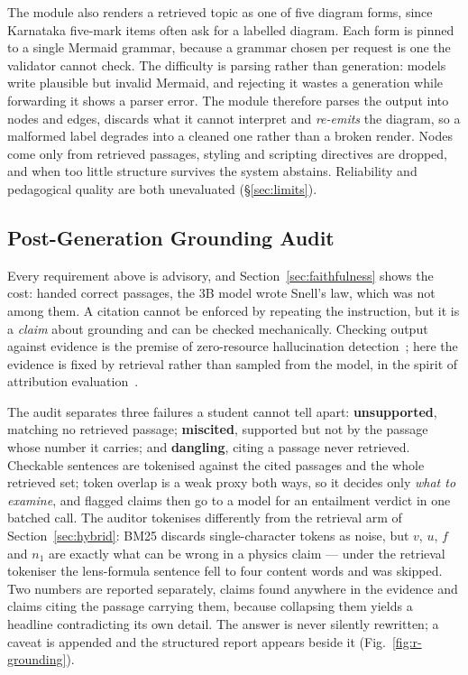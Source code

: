 \documentclass[conference]{IEEEtran}
\begin{document}
The module also renders a retrieved topic as one of five diagram forms, since
Karnataka five-mark items often ask for a labelled diagram. Each form is pinned
to a single Mermaid grammar, because a grammar chosen per request is one the
validator cannot check. The difficulty is parsing rather than generation:
models write plausible but invalid Mermaid, and rejecting it wastes a
generation while forwarding it shows a parser error. The module therefore
parses the output into nodes and edges, discards what it cannot interpret and
\emph{re-emits} the diagram, so a malformed label degrades into a cleaned one
rather than a broken render. Nodes come only from retrieved passages, styling
and scripting directives are dropped, and when too little structure survives
the system abstains. Reliability and pedagogical quality are both unevaluated
(§\ref{sec:limits}).

\subsection{Post-Generation Grounding Audit}
\label{sec:audit}
Every requirement above is advisory, and Section~\ref{sec:faithfulness} shows
the cost: handed correct passages, the $3$B model wrote Snell's law, which was
not among them. A citation cannot be enforced by repeating the instruction, but
it is a \emph{claim} about grounding and can be checked mechanically. Checking
output against evidence is the premise of zero-resource hallucination
detection~\cite{manakul2023}; here the evidence is fixed by retrieval rather
than sampled from the model, in the spirit of attribution
evaluation~\cite{gao2023}.

The audit separates three failures a student cannot tell apart:
\textbf{unsupported}, matching no retrieved passage; \textbf{miscited},
supported but not by the passage whose number it carries; and
\textbf{dangling}, citing a passage never retrieved. Checkable sentences are
tokenised against the cited passages and the whole retrieved set; token overlap
is a weak proxy both ways, so it decides only \emph{what to examine}, and
flagged claims then go to a model for an entailment verdict in one batched
call. The auditor tokenises differently from the retrieval arm of
Section~\ref{sec:hybrid}: BM25 discards single-character tokens as noise, but
$v$, $u$, $f$ and $n_1$ are exactly what can be wrong in a physics claim ---
under the retrieval tokeniser the lens-formula sentence fell to four content
words and was skipped. Two numbers are reported separately, claims found
anywhere in the evidence and claims citing the passage carrying them, because
collapsing them yields a headline contradicting its own detail. The answer is
never silently rewritten; a caveat is appended and the structured report
appears beside it (Fig.~\ref{fig:r-grounding}).
\end{document}
